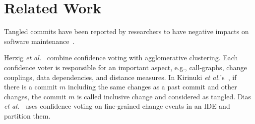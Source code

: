\section{Related Work}
\label{related:sec}

Tangled commits have been reported by researchers to have negative
impacts on software
maintenance~\cite{tao-fse12,kim-emse16,kim-msr13,hill-tse12,nguyen-issre13,flexeme-fse20,smartcommit-fse21}.

\vspace{1pt}
 Herzig {\em et
  al.}~\cite{kim-msr13,kim-emse16} combine confidence voting with
agglomerative clustering.
Each confidence voter is responsible for an important aspect, e.g.,
call-graphs, change couplings, data dependencies, and distance
measures. In Kirinuki {\em et al.}'s~\cite{higo-apsec16, higo-icpc14},
if there is a commit $m$ including the same changes as a past commit
and other changes, the commit $m$ is called inclusive change and
considered as tangled. Dias {\em et al.}~\cite{dias-saner15} uses
confidence voting on fine-grained change events in an IDE and
partition them.
%


